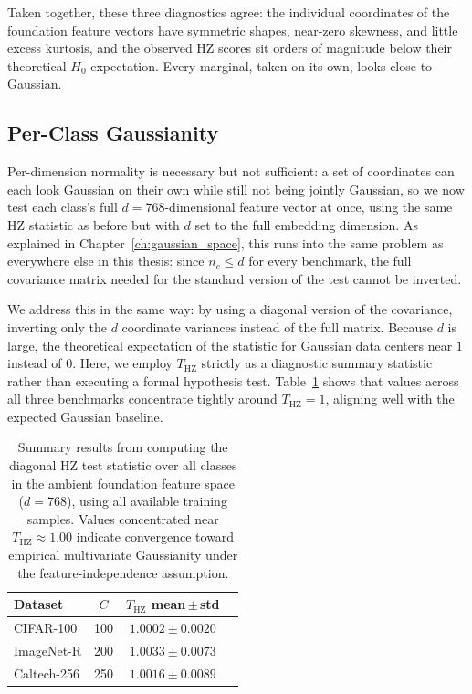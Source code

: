 Taken together, these three diagnostics agree: the individual coordinates of the foundation feature vectors have symmetric shapes, near-zero skewness, and little excess kurtosis, and the observed HZ scores sit orders of magnitude below their theoretical $H_0$ expectation. Every marginal, taken on its own, looks close to Gaussian.

\subsection{Per-Class Gaussianity}
\label{sec:mv_gaussianity_results}

Per-dimension normality is necessary but not sufficient: a set of coordinates can each look Gaussian on their own while still not being jointly Gaussian, so we now test each class's full $d=768$-dimensional feature vector at once, using the same HZ statistic as before but with $d$ set to the full embedding dimension. As explained in Chapter~\ref{ch:gaussian_space}, this runs into the same problem as everywhere else in this thesis: since $n_c \leq d$ for every benchmark, the full covariance matrix needed for the standard version of the test cannot be inverted.

We address this in the same way: by using a diagonal version of the covariance, inverting only the $d$ coordinate variances instead of the full matrix. Because $d$ is large, the theoretical expectation of the statistic for Gaussian data centers near $1$ instead of $0$. Here, we employ $T_{\mathrm{HZ}}$ strictly as a diagnostic summary statistic rather than executing a formal hypothesis test. Table~\ref{tab:gaussianity_hz} shows that values across all three benchmarks concentrate tightly around $T_{\mathrm{HZ}} = 1$, aligning well with the expected Gaussian baseline.

\begin{table}[htb]
    \centering
    \caption{Summary results from computing the diagonal HZ test statistic over all classes in the ambient foundation feature space ($d=768$), using all available training samples. Values concentrated near $T_{\mathrm{HZ}} \approx 1.00$ indicate convergence toward empirical multivariate Gaussianity under the feature-independence assumption.}
    \label{tab:gaussianity_hz}
    \small
    \setlength{\tabcolsep}{4pt}
    \begin{tabular}{lcc c}
        \toprule
        \textbf{Dataset} & $C$ & $T_{\mathrm{HZ}}$ mean\,$\pm$\,std \\
        \midrule
        CIFAR-100   & 100 & $1.0002 \pm 0.0020$  \\
        ImageNet-R  & 200 & $1.0033 \pm 0.0073$ \\
        Caltech-256 & 250 & $1.0016 \pm 0.0089$ \\
        \bottomrule
    \end{tabular}
\end{table}

